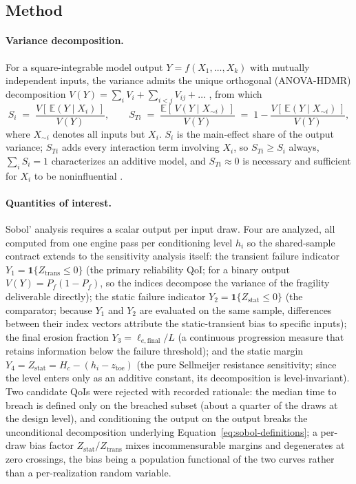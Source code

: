 \subsection{Method}
\label{subsec: GSA Method}

\paragraph{Variance decomposition.}
For a square-integrable model output $Y = f(X_1, \ldots, X_k)$ with mutually
independent inputs, the variance admits the unique orthogonal
(ANOVA-HDMR) decomposition
$V(Y) = \sum_i V_i + \sum_{i<j} V_{ij} + \ldots$
\parencite{sobol_1993, saltelli_primer_2008}, from which
\begin{equation}
  S_i \;=\; \frac{V\!\left[\,\mathbb{E}(Y \mid X_i)\,\right]}{V(Y)},
  \qquad
  S_{Ti} \;=\; \frac{\mathbb{E}\!\left[\,V(Y \mid X_{\sim i})\,\right]}{V(Y)}
  \;=\; 1 - \frac{V\!\left[\,\mathbb{E}(Y \mid X_{\sim i})\,\right]}{V(Y)},
  \label{eq:sobol-definitions}
\end{equation}
where $X_{\sim i}$ denotes all inputs but $X_i$. $S_i$ is the main-effect
share of the output variance; $S_{Ti}$ adds every interaction term involving
$X_i$, so $S_{Ti} \geq S_i$ always, $\sum_i S_i = 1$ characterizes an
additive model, and $S_{Ti} \approx 0$ is necessary and sufficient for
$X_i$ to be noninfluential \parencite{homma_saltelli_1996,
saltelli_primer_2008}.

\paragraph{Quantities of interest.}
Sobol' analysis requires a scalar output per input draw. Four are analyzed,
all computed from one engine pass per conditioning level $h_i$ so the
shared-sample contract extends to the sensitivity analysis itself:
the transient failure indicator $Y_1 = \mathbf{1}\{Z_{\mathrm{trans}} \leq
0\}$ (the primary reliability QoI; for a binary output $V(Y) = P_f(1 -
P_f)$, so the indices decompose the variance of the fragility deliverable
directly); the static failure indicator $Y_2 = \mathbf{1}\{Z_{\mathrm{stat}}
\leq 0\}$ (the comparator; because $Y_1$ and $Y_2$ are evaluated on the same
sample, differences between their index vectors attribute the
static-transient bias to specific inputs); the final erosion fraction
$Y_3 = \ell_{e,\mathrm{final}}/L$ (a continuous progression measure that
retains information below the failure threshold); and the static margin
$Y_4 = Z_{\mathrm{stat}} = H_c - (h_i - z_{\mathrm{toe}})$ (the pure
Sellmeijer resistance sensitivity; since the level enters only as an
additive constant, its decomposition is level-invariant). Two candidate
QoIs were rejected with recorded rationale: the median time to breach is
defined only on the breached subset (about a quarter of the draws at the
design level), and conditioning the output on the output breaks the
unconditional decomposition underlying
Equation~\eqref{eq:sobol-definitions}; a per-draw bias factor
$Z_{\mathrm{stat}}/Z_{\mathrm{trans}}$ mixes incommensurable margins and
degenerates at zero crossings, the bias being a population functional of the
two curves rather than a per-realization random variable.

